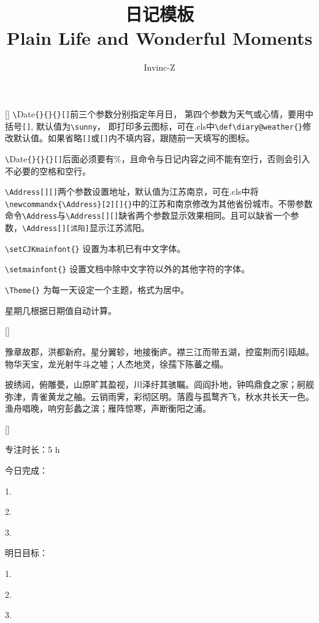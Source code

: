 \documentclass{diary}
\title{日记模板 \\{\small Plain Life and Wonderful Moments}}
\author{Invinc-Z}
\begin{document}
\maketitle

\Address[中国][北京]
[\sun]%
\verb|\|Date\verb|{}{}{}[]|前三个参数分别指定年月日， 第四个参数为天气或心情，要用中括号\verb|[]|, 默认值为\verb|\sunny|， 即打印多云图标，可在.cls中\verb|\def\diary@weather{}|修改默认值。如果省略\verb|[]|或\verb|[]|内不填内容，跟随前一天填写的图标。

\verb|\|Date\verb|{}{}{}[]|后面必须要有\%，且命令与日记内容之间不能有空行，否则会引入不必要的空格和空行。

\verb|\Address[][]|两个参数设置地址，默认值为江苏南京，可在.cls中将
\verb|\newcommandx{\Address}[2][]{}|中的江苏和南京修改为其他省份城市。不带参数命令\verb|\Address|与\verb|\Address[][]|缺省两个参数显示效果相同。且可以缺省一个参数，\verb|\Address[][沭阳]|显示江苏沭阳。

\verb|\setCJKmainfont{}| 设置为本机已有中文字体。

\verb|\setmainfont{}| 设置文档中除中文字符以外的其他字符的字体。

\verb|\Theme{}| 为每一天设定一个主题，格式为居中。

星期几根据日期值自动计算。


\Address[][沭阳]
[]%
 \par
豫章故郡，洪都新府。星分翼轸，地接衡庐。襟三江而带五湖，控蛮荆而引瓯越。物华天宝，龙光射牛斗之墟；人杰地灵，徐孺下陈蕃之榻。

披绣闼，俯雕甍，山原旷其盈视，川泽纡其骇瞩。闾阎扑地，钟鸣鼎食之家；舸舰弥津，青雀黄龙之舳。云销雨霁，彩彻区明。落霞与孤鹜齐飞，秋水共长天一色。渔舟唱晚，响穷彭蠡之滨；雁阵惊寒，声断衡阳之浦。

\Address[][]
[\winkSmile]%
 \par
专注时长：5 h  \par
\quad \par
今日完成：\par
1.  \par
2.  \par
3.  \par
\quad \par
明日目标：\par
1. \par
2. \par
3. \par
\end{document}
